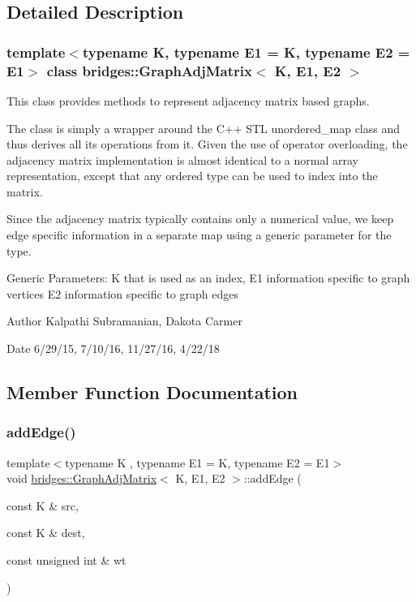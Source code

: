 \subsection{Detailed Description}
\subsubsection*{template$<$typename K, typename E1 = K, typename E2 = E1$>$\newline
class bridges\+::\+Graph\+Adj\+Matrix$<$ K, E1, E2 $>$}

This class provides methods to represent adjacency matrix based graphs. 

The class is simply a wrapper around the C++ S\+TL unordered\+\_\+map class and thus derives all its operations from it. Given the use of operator overloading, the adjacency matrix implementation is almost identical to a normal array representation, except that any ordered type can be used to index into the matrix.

Since the adjacency matrix typically contains only a numerical value, we keep edge specific information in a separate map using a generic parameter for the type.

Generic Parameters\+: K that is used as an index, E1 information specific to graph vertices E2 information specific to graph edges

\begin{DoxyAuthor}{Author}
Kalpathi Subramanian, Dakota Carmer 
\end{DoxyAuthor}
\begin{DoxyDate}{Date}
6/29/15, 7/10/16, 11/27/16, 4/22/18 
\end{DoxyDate}


\subsection{Member Function Documentation}
\mbox{\label{classbridges_1_1_graph_adj_matrix_a785f15a8ca7857a72c34e51ae0c24834}} 
\subsubsection{\texorpdfstring{add\+Edge()}{addEdge()}}
{\footnotesize\ttfamily template$<$typename K , typename E1  = K, typename E2  = E1$>$ \\
void \mbox{\hyperlink{classbridges_1_1_graph_adj_matrix}{bridges\+::\+Graph\+Adj\+Matrix}}$<$ K, E1, E2 $>$\+::add\+Edge (\begin{DoxyParamCaption}\item[{const K \&}]{src,  }\item[{const K \&}]{dest,  }\item[{const unsigned int \&}]{wt }\end{DoxyParamCaption})\hspace{0.3cm}{\ttfamily [inline]}}

